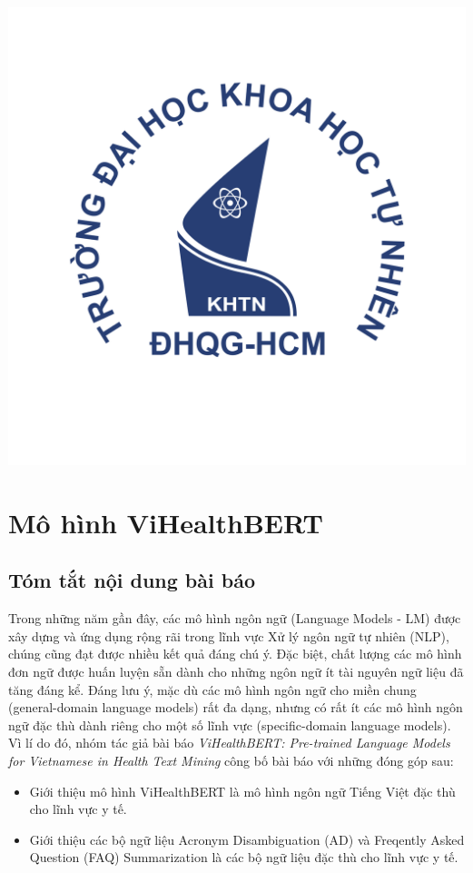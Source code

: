 \documentclass[12pt]{article}
\begin{document}
\begin{titlepage}
\includegraphics[scale=.3]{img/hcmus-logo.png}\\[1cm] 

\vfill
\end{titlepage}


\tableofcontents
\pagebreak

\section{Mô hình ViHealthBERT}
\subsection{Tóm tắt nội dung bài báo}
Trong những năm gần đây, các mô hình ngôn ngữ (Language Models - LM) được xây dựng và ứng dụng rộng rãi trong lĩnh vực Xử lý ngôn ngữ tự nhiên (NLP), chúng cũng đạt được nhiều kết quả đáng chú ý. Đặc biệt, chất lượng các mô hình đơn ngữ được huấn luyện sẵn dành cho những ngôn ngữ ít tài nguyên ngữ liệu đã tăng đáng kể. Đáng lưu ý, mặc dù các mô hình ngôn ngữ cho miền chung (general-domain language models) rất đa dạng, nhưng có rất ít các mô hình ngôn ngữ đặc thù dành riêng cho một số lĩnh vực (specific-domain language models). Vì lí do đó, nhóm tác giả bài báo \textit{ViHealthBERT: Pre-trained Language Models for Vietnamese in Health Text Mining}\cite{minh-EtAl:2022:LREC} công bố bài báo với những đóng góp sau:
\begin{itemize}
\item Giới thiệu mô hình ViHealthBERT là mô hình ngôn ngữ Tiếng Việt đặc thù cho lĩnh vực y tế.
\item Giới thiệu các bộ ngữ liệu Acronym Disambiguation (AD) và Freqently Asked Question (FAQ) Summarization là các bộ ngữ liệu đặc thù cho lĩnh vực y tế.
\end{itemize}
\end{document}
